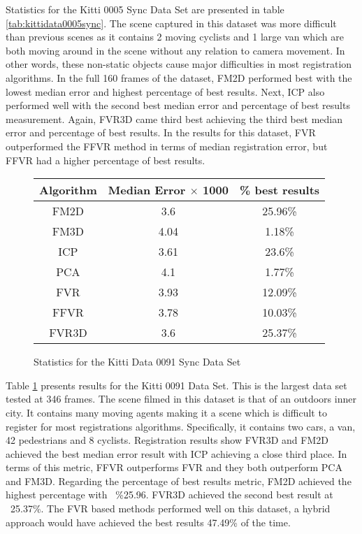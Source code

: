 Statistics for the Kitti 0005 Sync Data Set are presented in table \ref{tab:kittidata0005sync}. The scene captured in this dataset was more difficult than previous scenes as it contains 2 moving cyclists and 1 large van which are both moving around in the scene without any relation to camera movement. In other words, these non-static objects cause major difficulties in most registration algorithms. In the full 160 frames of the dataset, FM2D performed best with the lowest median error and highest percentage of best results. Next, ICP also performed well with the second best median error and percentage of best results measurement. Again, FVR3D came third best achieving the third best median error and percentage of best results. In the results for this dataset, FVR outperformed the FFVR method in terms of median registration error, but FFVR had a higher percentage of best results. \\


\begin{figure}
\centering
\begin{tabular}{ccc}
\hline
\textbf{Algorithm} & \textbf{Median Error $\times$ 1000} & \textbf{\% best results}\\ \hline
FM2D	& 3.6 & 25.96\%\\
FM3D	& 4.04 & 1.18\%\\
ICP	& 3.61 & 23.6\%\\
PCA	& 4.1 & 1.77\%\\
FVR	& 3.93 & 12.09\%\\
FFVR	& 3.78 & 10.03\%\\
FVR3D	& 3.6 & 25.37\%\\
\end{tabular}
\caption{Statistics for the Kitti Data 0091 Sync Data Set}
\label{tab:kittidata0091sync}
\end{figure} 

Table \ref{tab:kittidata0091sync} presents results for the Kitti 0091 Data Set. This is the largest data set tested at 346 frames. The scene filmed in this dataset is that of an outdoors inner city. It contains many moving agents making it a scene which is difficult to register for most registrations algorithms. Specifically, it contains two cars, a van, 42 pedestrians and 8 cyclists. Registration results show FVR3D and FM2D achieved the best median error result with ICP achieving a close third place. In terms of this metric, FFVR outperforms FVR and they both outperform PCA and FM3D. Regarding the percentage of best results metric, FM2D achieved the highest percentage with ~\%25.96. FVR3D achieved the second best result at ~25.37\%. The FVR based methods performed well on this dataset, a hybrid approach would have achieved the best results 47.49\% of the time.  \\  	

